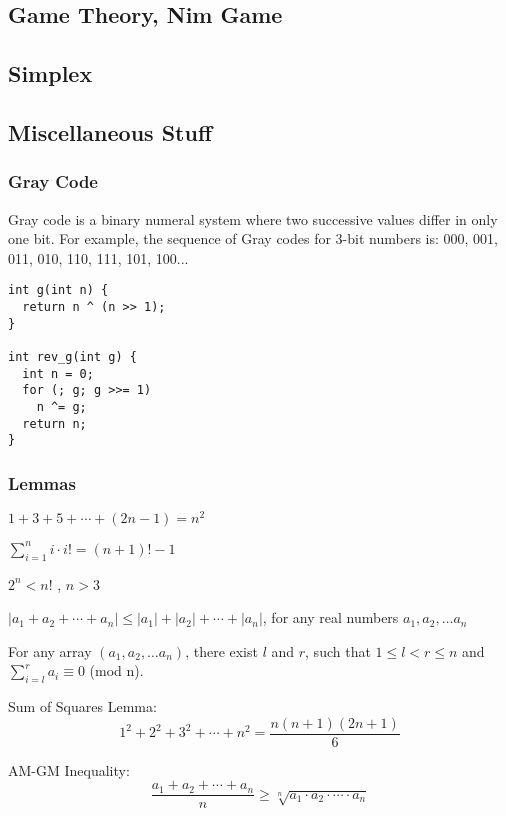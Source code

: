 \subsection{Game Theory, Nim Game}
\subsection{Simplex}

\newpage

\subsection{Miscellaneous Stuff}

\subsubsection{Gray Code}

Gray code is a binary numeral system where two successive values differ in only one bit. \cite{GrayCode_CPAlgo}
For example, the sequence of Gray codes for 3-bit numbers is: 000, 001, 011, 010, 110, 111, 101, 100...

\begin{lstlisting}
int g(int n) {
  return n ^ (n >> 1);
}

int rev_g(int g) {
  int n = 0;
  for (; g; g >>= 1)
    n ^= g;
  return n;
}
\end{lstlisting}

\subsubsection{Lemmas}

\begin{lemma}
$1 + 3 + 5 + \cdots + (2n - 1) = n^2$
\end{lemma}

\begin{lemma}
$\displaystyle \sum_{i=1}^{n} i \cdot i! = (n + 1)! - 1$
\end{lemma}

\begin{lemma}
  $2^n < n!$ , $n > 3$
\end{lemma}

\begin{lemma}
  $|a_1+a_2+\cdots+a_n| \leq |a_1| + |a_2| + \cdots + |a_n|$, for any real numbers $a_1, a_2, \dots a_n$
\end{lemma}

\begin{lemma}
  For any array $(a_1, a_2, \dots a_n)$, there exist $l$ and $r$, such that $1 \leq l < r \leq n$ and \\ $\displaystyle \sum_{i=l}^{r} a_i \equiv 0$ (mod n).
\end{lemma}

\begin{lemma}
  Sum of Squares Lemma: 
  \[
  1^2 + 2^2 + 3^2 + \cdots + n^2 = \frac{n(n+1)(2n+1)}{6}
  \]
\end{lemma}
  
\begin{lemma}
  AM-GM Inequality: 
  \[
  \frac{a_1 + a_2 + \cdots + a_n}{n} \geq \sqrt[n]{a_1 \cdot a_2 \cdot \cdots \cdot a_n}
  \]
\end{lemma}
  

